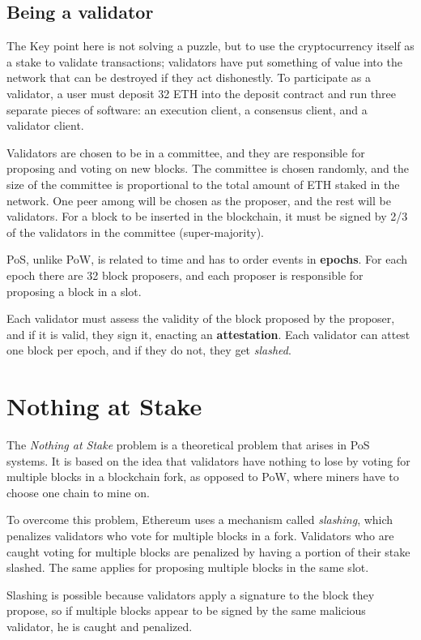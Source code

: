 \subsection{Being a validator}
The Key point here is not solving a puzzle, but to use the cryptocurrency itself as a stake to validate transactions; 
validators have put something of value into the network that can be destroyed if they act dishonestly.
To participate as a validator, a user must deposit 32 ETH into the deposit contract and run three separate pieces of software: an execution client, a consensus client, and a validator client.

Validators are chosen to be in a committee, and they are responsible for proposing and voting on new blocks. The committee is chosen randomly, and the size of the committee is proportional to the total amount of ETH staked in the network.
One peer among will be chosen as the proposer, and the rest will be validators.
For a block to be inserted in the blockchain, it must be signed by 2/3 of the validators in the committee (super-majority).

PoS, unlike PoW, is related to time and has to order events in \textbf{epochs}.
For each epoch there are 32 block proposers, and each proposer is responsible for proposing a block in a slot.

Each validator must assess the validity of the block proposed by the proposer, and if it is valid, they sign it, enacting an \textbf{attestation}.
Each validator can attest one block per epoch, and if they do not, they get \textit{slashed}.

\section{Nothing at Stake}

The \textit{Nothing at Stake} problem is a theoretical problem that arises in PoS systems. It is based on the idea that validators have nothing to lose by voting for multiple blocks in a blockchain fork, as opposed to PoW, where miners have to choose one chain to mine on.

To overcome this problem, Ethereum uses a mechanism called \textit{slashing}, which penalizes validators who vote for multiple blocks in a fork. Validators who are caught voting for multiple blocks are penalized by having a portion of their stake slashed.
The same applies for proposing multiple blocks in the same slot.

Slashing is possible because validators apply a signature to the block they propose, so if multiple blocks appear to be signed by the same malicious validator, he is caught and penalized.

